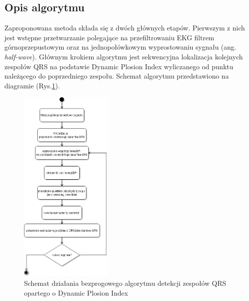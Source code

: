 \documentclass[a4paper,10pt]{article} %
\begin{document}
\subsection{Opis algorytmu}
Zaproponowana metoda \cite{dpi_qrs} składa się z dwóch głównych etapów. Pierwszym z nich jest wstępne przetwarzanie polegające na przefiltrowaniu EKG filtrem górnoprzepustowym oraz na jednopołówkowym wyprostowaniu sygnału (ang. \textit{half-wave}). Głównym krokiem algorytmu jest sekwencyjna lokalizacja kolejnych zespołów QRS na podstawie Dynamic Plosion Index wyliczanego od punktu należącego do poprzedniego zespołu. Schemat algorytmu przedstawiono na diagramie (Rys.\ref{schema}).
\begin{figure}[h]
    \centering
    \includegraphics[width=0.4\textwidth]{img/DPI_schema.png}
    \caption{Schemat działania bezprogowego algorytmu detekcji zespołów QRS opartego o Dynamic Plosion Index}
    \label{schema}
\end{figure}
\end{document}
